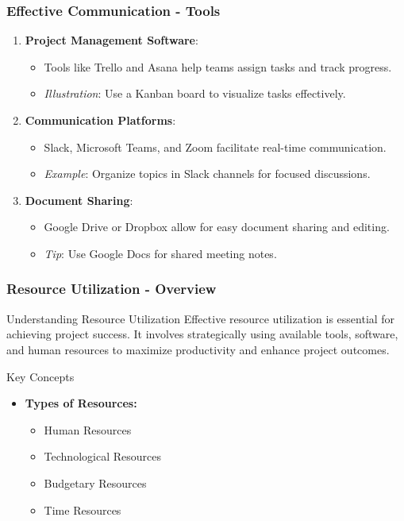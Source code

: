 \documentclass[aspectratio=169]{beamer}
\begin{document}
\begin{frame}[fragile]
    \frametitle{Effective Communication - Tools}
    \begin{enumerate}
        \item \textbf{Project Management Software}:
            \begin{itemize}
                \item Tools like Trello and Asana help teams assign tasks and track progress.
                \item \textit{Illustration}: Use a Kanban board to visualize tasks effectively.
            \end{itemize}
        
        \item \textbf{Communication Platforms}:
            \begin{itemize}
                \item Slack, Microsoft Teams, and Zoom facilitate real-time communication.
                \item \textit{Example}: Organize topics in Slack channels for focused discussions.
            \end{itemize}
        
        \item \textbf{Document Sharing}:
            \begin{itemize}
                \item Google Drive or Dropbox allow for easy document sharing and editing.
                \item \textit{Tip}: Use Google Docs for shared meeting notes.
            \end{itemize}
    \end{enumerate}
\end{frame}

\begin{frame}[fragile]
    \frametitle{Resource Utilization - Overview}
    \begin{block}{Understanding Resource Utilization}
        Effective resource utilization is essential for achieving project success. It involves strategically using available tools, software, and human resources to maximize productivity and enhance project outcomes.
    \end{block}
    \begin{block}{Key Concepts}
        \begin{itemize}
            \item \textbf{Types of Resources:}
            \begin{itemize}
                \item Human Resources
                \item Technological Resources
                \item Budgetary Resources
                \item Time Resources
            \end{itemize}
        \end{itemize}
    \end{block}
\end{frame}
\end{document}
